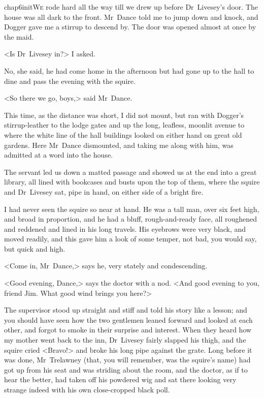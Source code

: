 

\lettrine{chap6initW}{e} rode hard all the way till we drew up before Dr~Livesey's door. The house was all dark to the front. Mr~Dance told me to jump down and knock, and Dogger gave me a stirrup to descend by. The door was opened almost at once by the maid.

\zz
<Is Dr~Livesey in?> I asked.

No, she said, he had come home in the afternoon but had gone up to the hall to dine and pass the evening with the squire.

<So there we go, boys,> said Mr~Dance.

This time, as the distance was short, I did not mount, but ran with Dogger's stirrup-leather to the lodge gates and up the long, leafless, moonlit avenue to where the white line of the hall buildings looked on either hand on great old gardens. Here Mr~Dance dismounted, and taking me along with him, was admitted at a word into the house.

The servant led us down a matted passage and showed us at the end into a great library, all lined with bookcases and busts upon the top of them, where the squire and Dr~Livesey sat, pipe in hand, on either side of a bright fire.

I had never seen the squire so near at hand. He was a tall man, over six feet high, and broad in proportion, and he had a bluff, rough-and-ready face, all roughened and reddened and lined in his long travels. His eyebrows were very black, and moved readily, and this gave him a look of some temper, not bad, you would say, but quick and high.

<Come in, Mr~Dance,> says he, very stately and condescending.

<Good evening, Dance,> says the doctor with a nod. <And good evening to you, friend Jim. What good wind brings you here?>

The supervisor stood up straight and stiff and told his story like a lesson; and you should have seen how the two gentlemen leaned forward and looked at each other, and forgot to smoke in their surprise and interest. When they heard how my mother went back to the inn, Dr~Livesey fairly slapped his thigh, and the squire cried <Bravo!> and broke his long pipe against the grate. Long before it was done, Mr~Trelawney (that, you will remember, was the squire's name) had got up from his seat and was striding about the room, and the doctor, as if to hear the better, had taken off his powdered wig and sat there looking very strange indeed with his own close-cropped black poll.

